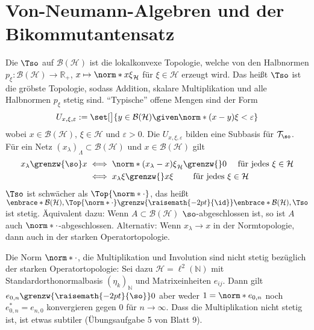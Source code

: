 \section{Von-Neumann-Algebren und der Bikommutantensatz} %
\label{sec:6}

\begin{erinnerungA}[{name=[starke Operatortopologie]},label=erinnerung:61]
	Die  $\Tso$ auf $\mathcal{B}(\mathcal{H})$ ist die lokalkonvexe Topologie, welche von den Halbnormen $p_\xi \colon \mathcal{B}(\mathcal{H}) \to \mathbb{R}_+$, $x \mapsto \norm*{x \xi}_\mathcal{H}$ für $\xi \in \mathcal{H}$ erzeugt wird.
	Das heißt $\Tso$ ist die gröbste Topologie, sodass Addition, skalare Multiplikation und alle Halbnormen $p_\xi$ stetig sind.
	\enquote{Typische} offene Mengen sind der Form
	\[
		U_{x,\xi,\varepsilon} := \set[\big]{y \in \mathcal{B}(\mathcal{H}) \given \norm*{(x-y)\xi}<\varepsilon}
	\]
	wobei $x \in \mathcal{B}(\mathcal{H})$, $\xi \in \mathcal{H}$ und $\varepsilon>0$. 
	Die $U_{x,\xi,\varepsilon}$ bilden eine Subbasis für $\mathcal{T}_\so$.
	Für ein Netz $(x_\lambda)_\Lambda \subset \mathcal{B}(\mathcal{H})$ und $x \in \mathcal{B}(\mathcal{H})$ gilt
	\begin{align}
		x_\lambda \grenzw{\so} x &\iff \norm*{(x_\lambda-x)\xi}_{\mathcal{H}} \grenzw{ }0 \quad \text{ für jedes } \xi \in \mathcal{H} \\
		&\iff x_\lambda \xi \grenzw{} x \xi \qquad \text{ für jedes } \xi \in \mathcal{H} 
	\end{align}
	$\Tso$ ist schwächer als $\Top{\norm*{\cdot}}$, das heißt $\enbrace*{\mathcal{B}(\mathcal{H}), \Top{\norm*{\cdot}}} \grenzw{\raisemath{-2pt}{\id}} \enbrace*{\mathcal{B}(\mathcal{H}), \Tso}$ ist stetig.
	Äquivalent dazu: Wenn $A \subset \mathcal{B}(\mathcal{H})$ $\so$-abgeschlossen ist, so ist $A$ auch $\norm*{\cdot}$-abgeschlossen. Alternativ: Wenn $x_\lambda\to x$ in der Normtopologie, dann auch in der starken Operatortopologie.
	
	Die Norm $\norm*{\cdot}$, die Multiplikation und Involution sind nicht stetig bezüglich der starken Operatortopologie:
	Sei dazu $\mathcal{H}=\ell^2(\mathbb{N})$ mit Standardorthonormalbasis $(\eta_k)_\mathbb{N}$ und Matrixeinheiten $e_{ij}$.
	Dann gilt $e_{0,n}\grenzw{\raisemath{-2pt}{\so}} 0$ aber weder $1=\norm*{e_{0,n}}$ noch $e_{0,n}^* = e_{n,0}$ konvergieren gegen $0$ für $n \to \infty$.
	Dass die Multiplikation nicht stetig ist, ist etwas subtiler (Übungsaufgabe 5 von Blatt 9).
\end{erinnerungA}

